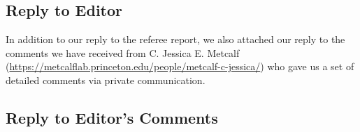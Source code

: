 \documentclass[11pt]{article}
\begin{document}
\replytitle
\subsection*{Reply to Editor}
 
\changes


In addition to our reply to the referee report, we also attached our reply to the comments we have received from
C. Jessica E. Metcalf (\url{https://metcalflab.princeton.edu/people/metcalf-c-jessica/}) who gave us a set of detailed comments via private communication.





\subsection*{Reply to Editor's Comments}
\end{document}
